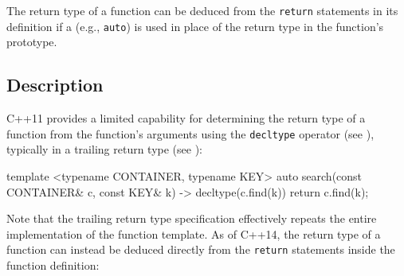 



\label{autoreturn}
\label{function-(auto)-return-type-deduction}
\setcounter{table}{0}
\setcounter{footnote}{0}
\setcounter{lstlisting}{0}




The return type of a function can be deduced from the \lstinline!return!
statements in its definition if a  (e.g.,
\lstinline!auto!) is used in place of the return type in the function's
prototype.

\subsection[Description]{Description}\label{description}

C++11 provides a limited capability for determining the return type of a
function from the function's arguments using the \lstinline!decltype!
operator (see ), typically in a trailing return
type (see ):

\begin{emcppslisting}
template <typename CONTAINER, typename KEY>
auto search(const CONTAINER& c, const KEY& k) -> decltype(c.find(k))
{
    return c.find(k);
}
\end{emcppslisting}
    

\noindent Note that the trailing return type specification effectively repeats the
entire implementation of the function template. As of C++14, the return
type of a function can instead be deduced directly from the
\lstinline!return! statements inside the function definition:

